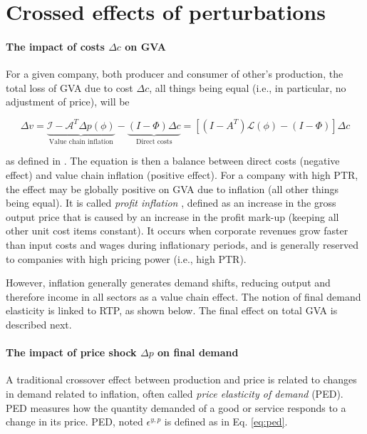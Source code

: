 \documentclass{article}
\begin{document}
\section{Crossed effects of perturbations}
\label{sec:cross_effects}


\paragraph{The impact of costs $\Delta c$ on GVA} For a given company, both producer and consumer of other's production, the total loss of GVA due to cost $\Delta c$, all things being equal (i.e., in particular, no adjustment of price), will be

\begin{equation}
    \Delta v = \underbrace{\mathcal{I - A}^T \Delta p(\phi)}_{\text{Value chain inflation}} - \underbrace{\left(I - \Phi\right) \Delta c}_{\text{Direct costs}} = \left[ \left(I - A^T\right) \mathcal{L}(\phi) - (I - \Phi) \right] \Delta c
\label{eq:delta_v_phi}
\end{equation}

\noindent as defined in \cite{desnos2023climate}. The equation is then a balance between direct costs (negative effect) and value chain inflation (positive effect). For a company with high PTR, the effect may be globally positive on GVA due to inflation (all other things being equal). It is called \textit{profit inflation} \cite{storm2023profit}, defined as an increase in the gross output price that is caused by an increase in the profit mark-up (keeping all other unit cost items constant). It occurs when corporate revenues grow faster than input costs and wages during inflationary periods, and is generally reserved to companies with high pricing power (i.e., high PTR). 

\vspace{0.1cm}

However, inflation generally generates demand shifts, reducing output and therefore income in all sectors as a value chain effect. The notion of final demand elasticity is linked to RTP, as shown below. The final effect on total GVA is described next.

\paragraph{The impact of price shock $\Delta p$ on final demand} A traditional crossover effect between production and price is related to changes in demand related to inflation, often called \textit{price elasticity of demand} (PED). PED measures how the quantity demanded of a good or service responds to a change in its price. PED, noted $\epsilon^{y,p}$ is defined as in Eq. \eqref{eq:ped}.
\end{document}
